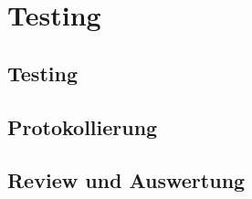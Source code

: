 
\section{Testing}
\subsection{Testing}
\subsection{Protokollierung}
\subsection{Review und Auswertung}